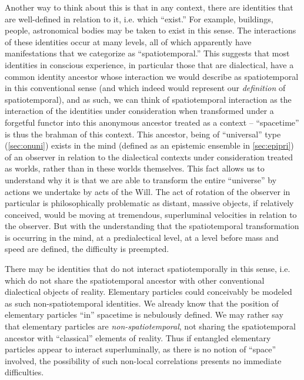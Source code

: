 \documentclass[pra,twocolumn,groupedaddress,10pt]{revtex4}
\theoremstyle{definition}
\begin{document}
Another way to think about this is that in any context, there are identities that are well-defined in relation to it, i.e. which ``exist.'' For example, buildings, people, astronomical bodies may be taken to exist in this sense. The interactions of these identities occur at many levels, all of which apparently have manifestations that we categorize as ``spatiotemporal.'' This suggests that most identities in conscious experience, in particular those that are dialectical, have a common identity ancestor whose interaction we would describe as spatiotemporal in this conventional sense (and which indeed would represent our \textit{definition} of spatiotemporal), and as such, we can think of spatiotemporal interaction as the interaction of the identities under consideration when transformed under a forgetful functor into this anonymous ancestor treated as a context -- ``spacetime'' is thus the brahman of this context. This ancestor, being of ``universal'' type (\autoref{sec:onuni}) exists in the mind (defined as an epistemic ensemble in \autoref{sec:epipri}) of an observer in relation to the dialectical contexts under consideration treated as worlds, rather than in these worlds themselves. This fact allows us to understand why it is that we are able to transform the entire ``universe'' by actions we undertake by acts of the Will. The act of rotation of the observer in particular is philosophically problematic as distant, massive objects, if relatively conceived, would be moving at tremendous, superluminal velocities in relation to the observer. But with the understanding that the spatiotemporal transformation is occurring in the mind, at a predialectical level, at a level before mass and speed are defined, the difficulty is preempted.

There may be identities that do not interact spatiotemporally in this sense, i.e. which do not share the spatiotemporal ancestor with other conventional dialectical objects of reality. Elementary particles could conceivably be modeled as such non-spatiotemporal identities. We already know that the position of elementary particles ``in'' spacetime is nebulously defined. We may rather say that elementary particles are \emph{non-spatiotemporal}, not sharing the spatiotemporal ancestor with ``classical'' elements of reality. Thus if entangled elementary particles appear to interact superluminally, as there is no notion of ``space'' involved, the possibility of such non-local correlations presents no immediate difficulties.
\end{document}

